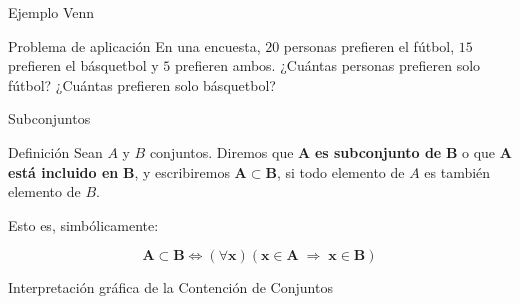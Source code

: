\documentclass[aspectratio=169]{beamer}
\begin{document}
\begin{frame}[t]{Ejemplo Venn}
    

\end{frame}
\begin{frame}[t]{Problema de aplicación}
\Large
En una encuesta, $20$ personas prefieren el fútbol, $15$ prefieren el básquetbol y $5$ prefieren ambos. ¿Cuántas personas prefieren solo fútbol? ¿Cuántas prefieren solo básquetbol?
\end{frame}

\begin{frame}{Subconjuntos}
\large
\begin{block}{Definición}
Sean $A$ y $B$ conjuntos. Diremos que $\mathbf{A}$\textbf{ es subconjunto de} $\mathbf{B}$ 
o que $\mathbf{A}$ \textbf{está incluido en} $\mathbf{B}$, y escribiremos $\mathbf{A \subset B}$, 
si todo elemento de $A$ es también elemento de $B$. 

Esto es, simbólicamente:

\[
\mathbf{A \subset B \Longleftrightarrow (\forall x)(x \in A \; \Rightarrow \;  x\in B)}
\]

\end{block}

\end{frame}
\begin{frame}{Interpretación gráfica de la Contención de Conjuntos}
\begin{center}

\end{center} 
\end{frame}
\end{document}
